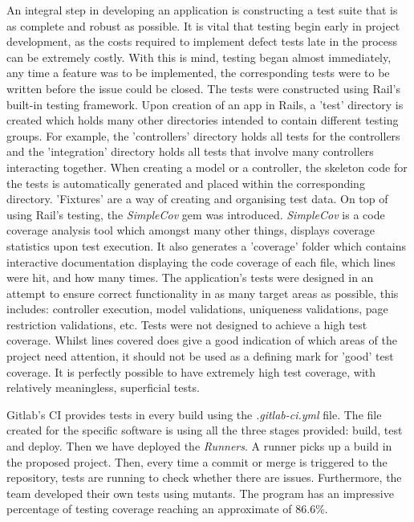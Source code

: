 \documentclass{l3proj}
\begin{document}
An integral step in developing an application is constructing a test suite that is as complete and robust as possible. It is vital that testing begin early in project development, as the costs required to implement defect tests late in the process can be extremely costly. With this is mind, testing began almost immediately, any time a feature was to be implemented, the corresponding tests were to be written before the issue could be closed. The tests were constructed using Rail's built-in testing framework. Upon creation of an app in Rails, a 'test' directory is created which holds many other directories intended to contain different testing groups. For example, the 'controllers' directory holds all tests for the controllers and the 'integration' directory holds all tests that involve many controllers interacting together. When creating a model or a controller, the skeleton code for the tests is automatically generated and placed within the corresponding directory. 'Fixtures' are a way of creating and organising test data. On top of using Rail's testing, the \textit{SimpleCov} gem was introduced. \textit{SimpleCov} is a code coverage analysis tool which amongst many other things, displays coverage statistics upon test execution. It also generates a 'coverage' folder which contains interactive documentation displaying the code coverage of each file, which lines were hit, and how many times. The application's tests were designed in an attempt to ensure correct functionality in as many target areas as possible, this includes: controller execution, model validations, uniqueness validations, page restriction validations, etc. Tests were not designed to achieve a high test coverage. Whilst lines covered does give a good indication of which areas of the project need attention, it should not be used as a defining mark for 'good' test coverage. It is perfectly possible to have extremely high test coverage, with relatively meaningless, superficial tests.


Gitlab's CI provides tests in every build using the \textit{.gitlab-ci.yml} file. The file created for the specific software is using all the three stages provided: build, test and deploy. Then we have deployed the \textit{Runners}. A runner picks up a build in the proposed project. Then, every time a commit or merge is triggered to the repository, tests are running to check whether there are issues. Furthermore, the team developed their own tests using mutants. The program has an impressive percentage of testing coverage reaching an approximate of 86.6\%.
\end{document}
